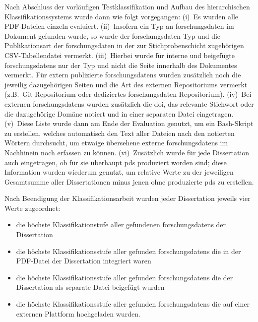 Nach Abschluss der vorläufigen Testklassifikation und Aufbau des hierarchischen Klassifikationssystems wurde dann wie folgt vorgegangen:
(i)~Es wurden alle PDF-Dateien einzeln evaluiert.
(ii)~Insofern ein Typ an \gls{forschungsdaten} im Dokument gefunden wurde, so wurde der \gls{forschungsdaten}-Typ und die Publikationsart der \gls{forschungsdaten} in der zur Stichprobenschicht zugehörigen CSV-Tabellendatei vermerkt.
(iii)~Hierbei wurde für interne und beigefügte \glspl{forschungsdaten} nur der Typ und nicht die Seite innerhalb des Dokumentes vermerkt.
Für extern publizierte \glspl{forschungsdaten} wurden zusätzlich noch die jeweilig dazugehörigen Seiten und die Art des externen Repositoriums vermerkt (z.B.~Git-Repositorium oder dediziertes \gls{forschungsdaten}-Repositorium).
(iv)~Bei externen \glspl{forschungsdaten} wurden zusätzlich die \gls{doi}, das relevante Stichwort oder die dazugehörige Domäne notiert und in einer separaten Datei eingetragen.
(v)~Diese Liste wurde dann am Ende der Evaluation genutzt, um ein Bash-Skript \autocite{my-dataset} zu erstellen, welches automatisch den Text aller Dateien nach den notierten Wörtern durchsucht, um etwaige übersehene externe \glspl{forschungsdaten} im Nachhinein noch erfassen zu können.
(vi)~Zusätzlich wurde für jede Dissertation auch eingetragen, ob für sie überhaupt \glspl{pd} produziert worden sind; diese Information wurden wiederum genutzt, um relative Werte zu der jeweiligen Gesamtsumme aller Dissertationen minus jenen ohne produzierte \glspl{pd} zu erstellen.
\pagebreak

Nach Beendigung der Klassifikationsarbeit wurden jeder Dissertation jeweils vier Werte zugeordnet: 
\begin{itemize}
    \item die höchste Klassifikationstufe aller gefundenen \glspl{forschungsdaten} der Dissertation
    \item die höchste Klassifikationsstufe aller gefunden \glspl{forschungsdaten} die in der PDF-Datei der Dissertation integriert waren
    \item die höchste Klassifikationsstufe aller gefunden \glspl{forschungsdaten} die der Dissertation als separate Datei beigefügt wurden
    \item die höchste Klassifikationsstufe aller gefunden \glspl{forschungsdaten} die auf einer externen Plattform hochgeladen wurden.
\end{itemize}

